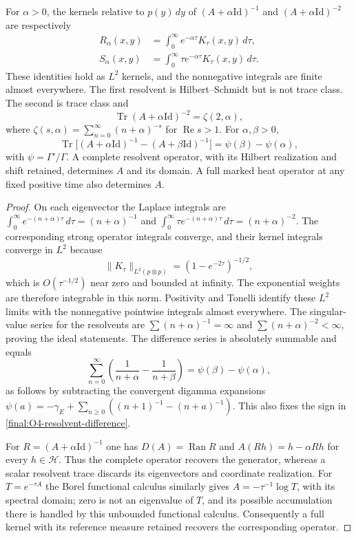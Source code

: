 \begin{proposition}
\label{final:O4-resolvents}
For $\alpha>0$, the kernels relative to $p(y)\,dy$ of
$(A+\alpha\mathrm{Id})^{-1}$ and $(A+\alpha\mathrm{Id})^{-2}$ are
respectively
\begin{align*}
 R_\alpha(x,y)&=\int_0^\infty e^{-\alpha\tau}K_\tau(x,y)\,d\tau,\\
 S_\alpha(x,y)&=\int_0^\infty \tau e^{-\alpha\tau}K_\tau(x,y)\,d\tau.
\end{align*}
These identities hold as $L^2$ kernels, and the nonnegative integrals
are finite almost everywhere.  The first resolvent is Hilbert--Schmidt
but is not trace class.  The second is trace class and
\[
 \operatorname{Tr}(A+\alpha\mathrm{Id})^{-2}=\zeta(2,\alpha),
\]
where $\zeta(s,\alpha)=\sum_{n=0}^\infty(n+\alpha)^{-s}$ for
$\operatorname{Re}s>1$.  For $\alpha,\beta>0$,
\begin{equation}\label{final:O4-resolvent-difference}
 \operatorname{Tr}\bigl[(A+\alpha\mathrm{Id})^{-1}
       -(A+\beta\mathrm{Id})^{-1}\bigr]
       =\psi(\beta)-\psi(\alpha),
\end{equation}
with $\psi=\Gamma'/\Gamma$.
A complete resolvent operator, with its Hilbert realization and shift
retained, determines $A$ and its domain.  A full marked heat operator
at any fixed positive time also determines $A$.
\end{proposition}

\begin{proof}
On each eigenvector the Laplace integrals are
$\int_0^\infty e^{-(n+\alpha)\tau}\,d\tau=(n+\alpha)^{-1}$ and
$\int_0^\infty\tau e^{-(n+\alpha)\tau}\,d\tau=(n+\alpha)^{-2}$.
The corresponding strong operator integrals converge, and their
kernel integrals converge in $L^2$ because
\[
 \|K_\tau\|_{L^2(p\otimes p)}
       =(1-e^{-2\tau})^{-1/2},
\]
which is $O(\tau^{-1/2})$ near zero and bounded at infinity.
The exponential weights are therefore integrable in this norm.
Positivity and Tonelli identify these $L^2$ limits with the
nonnegative pointwise integrals almost everywhere.
The singular-value series for the resolvents are
$\sum(n+\alpha)^{-1}=\infty$ and
$\sum(n+\alpha)^{-2}<\infty$, proving the ideal statements.
The difference series is absolutely summable and equals
\[
 \sum_{n=0}^\infty
   \left(\frac1{n+\alpha}-\frac1{n+\beta}\right)
 =\psi(\beta)-\psi(\alpha),
\]
as follows by subtracting the convergent digamma expansions
$\psi(a)=-\gamma_E+\sum_{n\geq0}((n+1)^{-1}-(n+a)^{-1})$.
This also fixes the sign in \eqref{final:O4-resolvent-difference}.

For $R=(A+\alpha\mathrm{Id})^{-1}$ one has
$D(A)=\operatorname{Ran}R$ and
$A(Rh)=h-\alpha Rh$ for every $h\in\mathcal H$.
Thus the complete operator recovers the generator, whereas a scalar
resolvent trace discards its eigenvectors and coordinate realization.
For $T=e^{-\tau A}$ the Borel functional calculus similarly gives
$A=-\tau^{-1}\log T$, with its spectral domain; zero is not an
eigenvalue of $T$, and its possible accumulation there is handled by
this unbounded functional calculus.  Consequently a full kernel with
its reference measure retained recovers the corresponding operator.
\end{proof}

